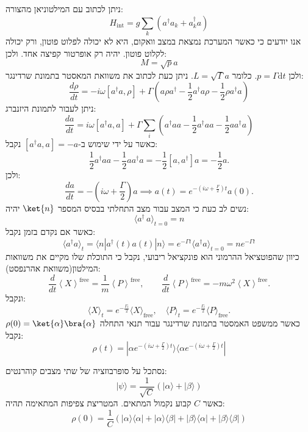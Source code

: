 \documentclass{tstextbook}
\begin{document}
\begin{example}
ניתן לכתוב עם המילטוניאן מהצורה:
$$H_{\mathrm{{int}}}=g\sum_{k}\left(a^{\dagger}a_{k}+a_{k}^{\dagger}a\right)$$
אנו יודעים כי כאשר המערכת נמצאת במצב וואקום, היא לא יכולה לפלוט פוטון, ורק יכולה לקלוט פוטון. יהיה רק אופרטור קפיצה אחד. ולכן:
$$M=\sqrt{p}a$$
ולכן \(p=\Gamma \mathrm{d}t\). כלומר \(L=\sqrt{ \Gamma }a\). ניתן כעת לכתוב את משוואת המאסטר בתמונת שרדינגר:
$$\frac{d\rho}{d t}=-i\omega\left[a^{\dagger}a,\rho\right]+\Gamma\left(a\rho a^{\dagger}-\frac{1}{2}a^{\dagger}a\rho-\frac{1}{2}\rho a^{\dagger}a\right)$$
ניתן לעבור לתמונת היזנברג:
$${\frac{d a}{d t}}=i\omega[a^{\dagger}a,a]+\Gamma\sum_{i}\left(a^{\dagger}a a-{\frac{1}{2}}a^{\dagger}a a-{\frac{1}{2}}a a^{\dagger}a\right)$$
כאשר על ידי שימוש ב-\(\left[ a^{\dagger}a,a \right]=-a\) נקבל:
$${\frac{1}{2}}a^{\dagger}a a-{\frac{1}{2}}a a^{\dagger}a=-{\frac{1}{2}}\left[a,a^{\dagger}\right]a=-{\frac{1}{2}}a.$$
ולכן:
$${\frac{d a}{d t}}=-\left(i\omega+{\frac{\Gamma}{2}}\right)a\implies a\left(t\right)=e^{-\left(i\omega+\frac{F}{2}\right)t}a\left(0\right).$$
נשים לב כעת כי המצב עבור מצב התחלתי בבסיס המספר \(\ket{n}\) יהיה:
$$\langle a^{\dagger}\,a\rangle_{t=0}=n$$
כאשר אם נקדם בזמן נקבל:
$$\langle a^{\dagger}a\rangle_{t}=\langle n|a^{\dagger}(t)a(t)|n\rangle=e^{-\Gamma t}\langle a^{\dagger}a\rangle_{t=0}=n e^{-\Gamma t}$$
כיוון שהפוטציאל ההרמוני הוא פונקציאל ריבועי, נקבל כי התוכלת שלו מקיים את משוואות המילטון(משוואת אהרנפסט):
$$\frac{d}{d t}\left\langle X\right\rangle^{\mathrm{free}}=\frac{1}{m}\left\langle P\right\rangle^{\mathrm{free}},\qquad\frac{d}{d t}\left\langle P\right\rangle^{\mathrm{free}}=-m\omega^{2}\left\langle X\right\rangle^{\mathrm{free}}.$$
ונקבל:
$$\langle X\rangle_{t}=e^{-\frac{\Gamma_{t}}{2}}\langle X\rangle_{\mathrm{free}},\quad\langle P\rangle_{t}=e^{-\frac{\Gamma_{t}}{2}}\langle P\rangle_{\mathrm{free}}.$$
כאשר ממשפט האמסטר בתמונת שרדינגר עבור תנאי התחלה \(\rho(0)=\ket{\alpha}\bra{\alpha}\) נקבל:
$$\rho(t)=|\alpha e^{-(i\omega+\frac{\Gamma}{2})t}\rangle\langle\alpha e^{-(i\omega+\frac{\Gamma}{2})t}|$$

\end{example}
\begin{definition}
נסתכל על סופרבוזציה של שתי מצבים קוהרנטים:
$$|\psi\rangle=\frac{1}{\sqrt{C}}(|\alpha\rangle+|\beta\rangle)$$
כאשר \(C\) קבוע נקמול המתאים. המטריצת צפיפות המתאימה תהיה:
$$\rho(0)=\frac{1}{C}(|\alpha\rangle\langle\alpha|+|\alpha\rangle\langle\beta|+|\beta\rangle\langle\alpha|+|\beta\rangle\langle\beta|)$$

\end{definition}
\end{document}
